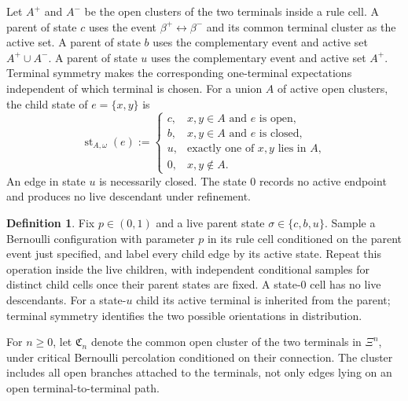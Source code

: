 \documentclass[scheme=plain,11pt]{ctexart}
\theoremstyle{definition}
\newtheorem{definition}[theorem]{Definition}
\theoremstyle{remark}
\begin{document}
Let $A^+$ and $A^-$ be the open clusters of the two terminals inside a rule cell.
A parent of state $c$ uses the event $\beta^+\leftrightarrow\beta^-$ and its common terminal cluster as the active set.
A parent of state $b$ uses the complementary event and active set $A^+\cup A^-$.
A parent of state $u$ uses the complementary event and active set $A^+$.
Terminal symmetry makes the corresponding one-terminal expectations independent of which terminal is chosen.
For a union $A$ of active open clusters, the child state of $e=\{x,y\}$ is
\[
 \operatorname{st}_{A,\omega}(e):=
 \begin{cases}
 c,&x,y\in A\text{ and }e\text{ is open},\\
 b,&x,y\in A\text{ and }e\text{ is closed},\\
 u,&\text{exactly one of }x,y\text{ lies in }A,\\
 0,&x,y\notin A.
 \end{cases}
\]
An edge in state $u$ is necessarily closed.
The state $0$ records no active endpoint and produces no live descendant under refinement.


\begin{definition}\label{def:random-eigs}
Fix $p\in(0,1)$ and a live parent state $\sigma\in\{c,b,u\}$. Sample a Bernoulli configuration with parameter $p$ in its rule cell conditioned on the parent event just specified, and label every child edge by its active state. Repeat this operation inside the live children, with independent conditional samples for distinct child cells once their parent states are fixed. A state-$0$ cell has no live descendants. For a state-$u$ child its active terminal is inherited from the parent; terminal symmetry identifies the two possible orientations in distribution.
\end{definition}

For $n\ge0$, let $\mathfrak C_n$ denote the common open cluster of the two terminals in $\Xi^n$, under critical Bernoulli percolation conditioned on their connection.
The cluster includes all open branches attached to the terminals, not only edges lying on an open terminal-to-terminal path.
\end{document}
